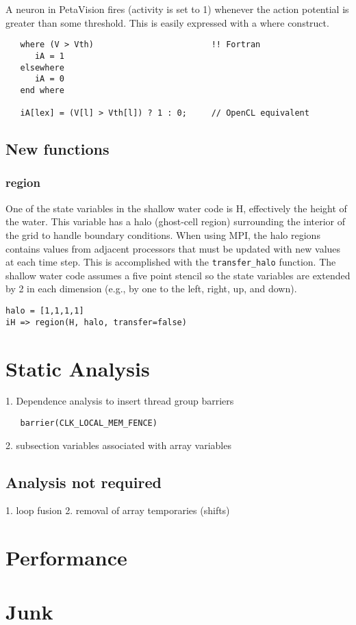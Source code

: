 \documentclass[10pt, conference, compsocconf]{IEEEtran}
\begin{document}
A neuron in PetaVision fires (activity is set to 1)
whenever the action potential is greater than some threshold.
This is easily expressed with a where construct.

\begin{verbatim}
   where (V > Vth)                        !! Fortran
      iA = 1
   elsewhere
      iA = 0
   end where

   iA[lex] = (V[l] > Vth[l]) ? 1 : 0;     // OpenCL equivalent
\end{verbatim}

\subsection{New functions}

\subsubsection{region}

One of the state variables in the shallow water code is H, effectively the
height of the water.  This variable has a halo (ghost-cell region) surrounding
the interior of the grid to handle boundary conditions.  When using
MPI, the halo regions contains values from adjacent processors that must be
updated with new values at each time step.  This is accomplished with the
{\tt transfer\_halo} function.  The shallow water code assumes a five point stencil
so the state variables are extended by 2 in each dimension (e.g., by one to the
left, right, up, and down).

\begin{verbatim}
halo = [1,1,1,1]
iH => region(H, halo, transfer=false)
\end{verbatim}

\section{Static Analysis}

1. Dependence analysis to insert thread group barriers

\begin{verbatim}
   barrier(CLK_LOCAL_MEM_FENCE)
\end{verbatim}

2. subsection variables associated with array variables

\subsection{Analysis not required}

1. loop fusion
2. removal of array temporaries (shifts)

\section{Performance}

\section{Junk}

\cite{chamberlain04zpl,pgi10accelerator}



\end{document}
